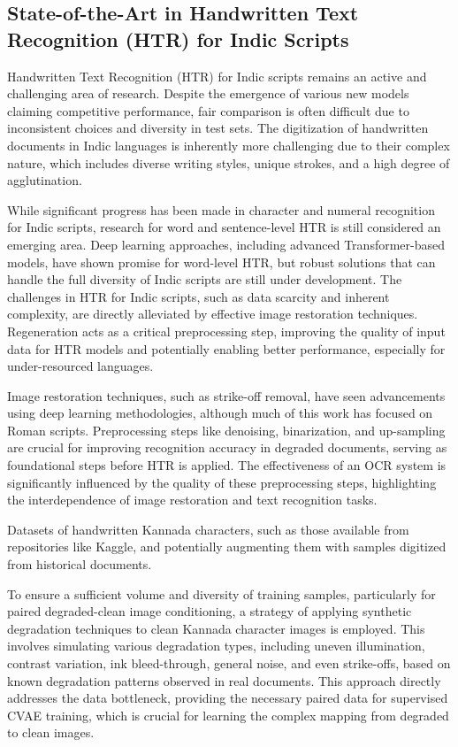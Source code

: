 \documentclass[conference]{IEEEtran}
\begin{document}
\subsection{State-of-the-Art in Handwritten Text Recognition (HTR) for Indic Scripts}
\justify
Handwritten Text Recognition (HTR) for Indic scripts remains an active and challenging area of research. Despite the emergence of various new models claiming competitive performance, fair comparison is often difficult due to inconsistent choices and diversity in test sets.\cite{Hebbi2023} The digitization of handwritten documents in Indic languages is inherently more challenging due to their complex nature, which includes diverse writing styles, unique strokes, and a high degree of agglutination.

While significant progress has been made in character and numeral recognition for Indic scripts, research for word and sentence-level HTR is still considered an emerging area. Deep learning approaches, including advanced Transformer-based models, have shown promise for word-level HTR, but robust solutions that can handle the full diversity of Indic scripts are still under development. The challenges in HTR for Indic scripts, such as data scarcity and inherent complexity, are directly alleviated by effective image restoration techniques. Regeneration acts as a critical preprocessing step, improving the quality of input data for HTR models and potentially enabling better performance, especially for under-resourced languages.

Image restoration techniques, such as strike-off removal, have seen advancements using deep learning methodologies, although much of this work has focused on Roman scripts. Preprocessing steps like denoising, binarization, and up-sampling are crucial for improving recognition accuracy in degraded documents, serving as foundational steps before HTR is applied.\cite{Emuru2023, Bhunia2023, Hebbi2023} The effectiveness of an OCR system is significantly influenced by the quality of these preprocessing steps, highlighting the interdependence of image restoration and text recognition tasks.



Datasets of handwritten Kannada characters, such as those available from repositories like Kaggle, and potentially augmenting them with samples digitized from historical documents.

To ensure a sufficient volume and diversity of training samples, particularly for paired degraded-clean image conditioning, a strategy of applying synthetic degradation techniques to clean Kannada character images is employed.\cite{Graves2013} This involves simulating various degradation types, including uneven illumination, contrast variation, ink bleed-through, general noise, and even strike-offs, based on known degradation patterns observed in real documents.\cite{Davis2020, Emuru2023} This approach directly addresses the data bottleneck, providing the necessary paired data for supervised CVAE training, which is crucial for learning the complex mapping from degraded to clean images.
\end{document}
